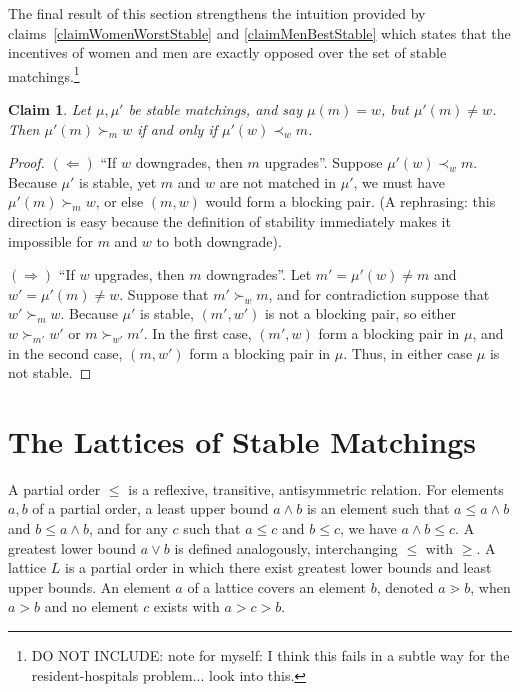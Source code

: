 \documentclass[12pt]{article}
\newtheorem{claim}[definition]{Claim}
\begin{document}
  The final result of this section strengthens the intuition provided by
  claims~\ref{claimWomenWorstStable} and \ref{claimMenBestStable} which states
  that the incentives of women and men are exactly opposed over the set of
  stable matchings.\footnote{
    DO NOT INCLUDE: note for myself: I think this fails in a subtle way for the
    resident-hospitals problem... look into this.
  }
  \begin{claim}
    Let $\mu, \mu'$ be stable matchings, and say $\mu(m) = w$, but $\mu'(m)\ne w$.
    Then $\mu'(m) \succ_m w$ if and only if $\mu'(w) \prec_w m$.
  \end{claim}
  \begin{proof}
    $(\Leftarrow)$ ``If $w$ downgrades, then $m$ upgrades''.
    Suppose $\mu'(w) \prec_w m$. Because $\mu'$ is stable, yet $m$ and $w$
    are not matched in $\mu'$, we must have $\mu'(m) \succ_m w$,
    or else $(m,w)$ would form a blocking pair.
    (A rephrasing: this direction is easy because the definition of stability
    immediately makes it impossible for $m$ and $w$ to both downgrade).

    $(\Rightarrow)$ ``If $w$ upgrades, then $m$ downgrades''.
    Let $m' = \mu'(w) \ne m$ and $w' = \mu'(m) \ne w$.
    Suppose that $m' \succ_w m$, and for contradiction suppose that $w' \succ_m w$.
    Because $\mu'$ is stable, $(m', w')$ is not a blocking pair,
    so either $w\succ_{m'} w'$ or $m\succ_{w'} m'$.
    In the first case, $(m',w)$ form a blocking pair in $\mu$,
    and in the second case, $(m,w')$ form a blocking pair in $\mu$.
    Thus, in either case $\mu$ is not stable.
  \end{proof}

\section{The Lattices of Stable Matchings}

  A partial order $\le$ is a reflexive, transitive, antisymmetric relation.
  For elements $a,b$ of a partial order, a least upper bound $a\wedge b$ is
  an element such that
  $a\le a\wedge b$ and $b\le a \wedge b$, and for any 
  $c$ such that $a\le c$ and $b\le c$, we have $a\wedge b\le c$.
  A greatest lower bound $a\vee b$ is defined analogously, interchanging $\le$
  with $\ge$.
  A lattice $L$ is a partial order in which there exist greatest lower bounds and
  least upper bounds.
  An element $a$ of a lattice covers an element $b$, denoted $a \gtrdot b$,
  when $a > b$ and no element $c$ exists with $a > c > b$.
\end{document}
